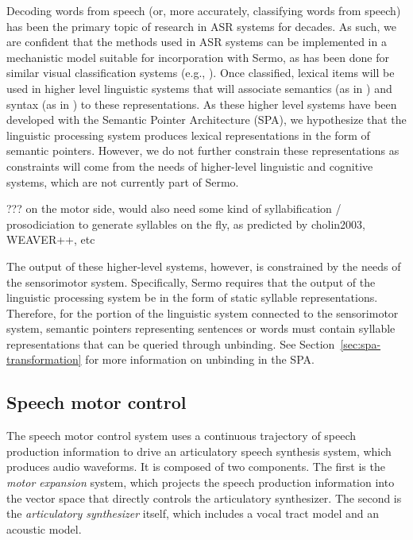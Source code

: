 Decoding words from speech
(or, more accurately,
classifying words from speech)
has been the primary topic of research
in ASR systems for decades.
As such, we are confident that
the methods used in ASR systems
can be implemented in a mechanistic model
suitable for incorporation with Sermo,
as has been done for similar
visual classification systems
(e.g., \citealt{hunsberger2013}).
Once classified, lexical items
will be used in higher level linguistic
systems that will associate
semantics (as in \citealt{blouw2013,blouw2015})
and syntax (as in \citealt{stewart2014,stewart2015})
to these representations.
As these higher level systems
have been developed with
the Semantic Pointer Architecture (SPA),
we hypothesize that the linguistic processing system
produces lexical representations
in the form of semantic pointers.
However, we do not further constrain these representations
as constraints will come from the needs of
higher-level linguistic and cognitive systems,
which are not currently part of Sermo.

??? on the motor side, would also need some kind of
syllabification / prosodiciation to generate
syllables on the fly, as predicted by
cholin2003, WEAVER++, etc

The output of these higher-level systems,
however, is constrained by the needs
of the sensorimotor system.
Specifically, Sermo requires that
the output of the
linguistic processing system
be in the form of static syllable representations.
Therefore, for the portion
of the linguistic system connected
to the sensorimotor system,
semantic pointers representing
sentences or words must contain
syllable representations that can be
queried through unbinding.
See Section~\ref{sec:spa-transformation}
for more information
on unbinding in the SPA.

\subsection{Speech motor control}
\label{sec:model-motorcontrol}

The speech motor control system
uses a continuous trajectory
of speech production information
to drive an articulatory
speech synthesis system,
which produces audio waveforms.
It is composed of two components.
The first is the \textit{motor expansion} system,
which projects the speech production information
into the vector space that
directly controls the articulatory synthesizer.
The second is
the \textit{articulatory synthesizer} itself,
which includes a vocal tract model
and an acoustic model.

